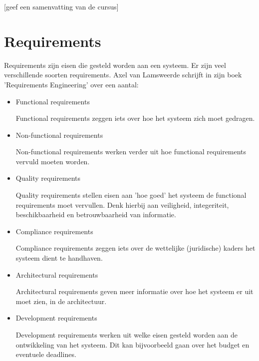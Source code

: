 \documentclass{article}
\begin{document}
	[geef een samenvatting van de cursus]
	
	\newpage
	
	
	\section{Requirements}
	
	Requirements zijn eisen die gesteld worden aan een systeem. Er zijn veel verschillende soorten requirements. Axel van Lamsweerde schrijft in zijn boek 'Requirements Engineering' over een aantal: \cite{Lamsweerde2009Requirements}

	\begin{itemize}
		\item Functional requirements

			Functional requirements zeggen iets over hoe het systeem zich moet gedragen.

		\item Non-functional requirements

			Non-functional requirements werken verder uit hoe functional requirements vervuld moeten worden.

		\item Quality requirements

			Quality requirements stellen eisen aan 'hoe goed' het systeem de functional requirements moet vervullen. Denk hierbij aan veiligheid, integeriteit, beschikbaarheid en betrouwbaarheid van informatie. \par

		\item Compliance requirements
	
		Compliance requirements zeggen iets over de wettelijke (juridische) kaders het systeem dient te handhaven.

		\item Architectural requirements
	
		Architectural requirements geven meer informatie over hoe het systeem er uit moet zien, in de architectuur.

		\item Development requirements

		Development requirements werken uit welke eisen gesteld worden aan de ontwikkeling van het systeem. Dit kan bijvoorbeeld gaan over het budget en eventuele deadlines. \par

	\end{itemize}
\end{document}
